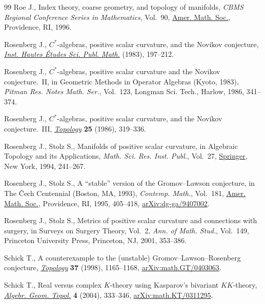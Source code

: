 \documentclass[pdftex]{sigma}
\numberwithin{equation}{section}
\begin{document}
\begin{thebibliography}{99}
Roe J., Index theory, coarse geometry, and topology of manifolds, \textit{CBMS
 Regional Conference Series in Mathematics}, Vol.~90, \href{https://doi.org/10.1090/cbms/090}{Amer. Math. Soc.},
 Providence, RI, 1996.

Rosenberg J., {$C^{\ast} $}-algebras, positive scalar curvature, and the
 {N}ovikov conjecture, \href{https://doi.org/10.1007/BF02953775}{\textit{Inst. Hautes \'Etudes Sci. Publ. Math.}}
 (1983), 197--212.

Rosenberg J., {$C^\ast$}-algebras, positive scalar curvature and the {N}ovikov
 conjecture.~{II}, in Geometric Methods in Operator Algebras ({K}yoto, 1983),
 \textit{Pitman Res. Notes Math. Ser.}, Vol.~123, Longman Sci. Tech., Harlow,
 1986, 341--374.

Rosenberg J., {$C^\ast$}-algebras, positive scalar curvature, and the {N}ovikov
 conjecture.~{III}, \href{https://doi.org/10.1016/0040-9383(86)90047-9}{\textit{Topology}} \textbf{25} (1986), 319--336.

Rosenberg J., Stolz S., Manifolds of positive scalar curvature, in Algebraic
 Topology and its Applications, \textit{Math. Sci. Res. Inst. Publ.}, Vol.~27,
 \href{https://doi.org/10.1007/978-1-4613-9526-3_8}{Springer}, New York, 1994, 241--267.

Rosenberg J., Stolz S., A ``stable'' version of the {G}romov--{L}awson
 conjecture, in The \v{C}ech Centennial ({B}oston, {MA}, 1993),
 \textit{Contemp. Math.}, Vol.~181, \href{https://doi.org/10.1090/conm/181/02046}{Amer. Math. Soc.}, Providence, RI, 1995,
 405--418, \href{https://arxiv.org/abs/dg-ga/9407002}{arXiv:dg-ga/9407002}.

Rosenberg J., Stolz S., Metrics of positive scalar curvature and connections
 with surgery, in Surveys on Surgery Theory, {V}ol.~2, \textit{Ann. of Math.
 Stud.}, Vol.~149, Princeton University Press, Princeton, NJ, 2001, 353--386.

Schick T., A counterexample to the (unstable) {G}romov--{L}awson--{R}osenberg
 conjecture, \href{https://doi.org/10.1016/S0040-9383(97)00082-7}{\textit{Topology}} \textbf{37} (1998), 1165--1168,
 \href{https://arxiv.org/abs/math.GT/0403063}{arXiv:math.GT/0403063}.

Schick T., Real versus complex {$K$}-theory using {K}asparov's bivariant
 {$KK$}-theory, \href{https://doi.org/10.2140/agt.2004.4.333}{\textit{Algebr. Geom. Topol.}} \textbf{4} (2004), 333--346,
 \href{https://arxiv.org/abs/math.KT/0311295}{arXiv:math.KT/0311295}.


\end{thebibliography}
\end{document}
